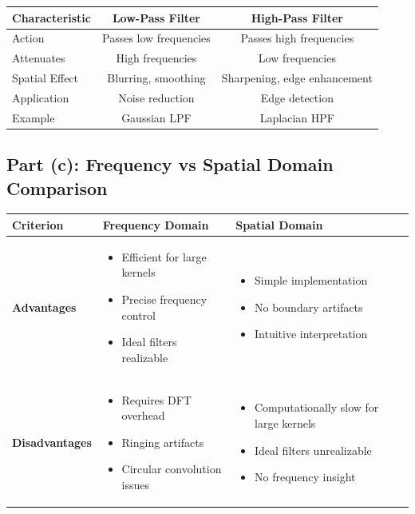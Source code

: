 \documentclass[12pt,a4paper]{article}
\begin{document}
\begin{center}
\begin{tabular}{|l|c|c|}
\hline
\textbf{Characteristic} & \textbf{Low-Pass Filter} & \textbf{High-Pass Filter} \\
\hline
Action & Passes low frequencies & Passes high frequencies \\
Attenuates & High frequencies & Low frequencies \\
Spatial Effect & Blurring, smoothing & Sharpening, edge enhancement \\
Application & Noise reduction & Edge detection \\
Example & Gaussian LPF & Laplacian HPF \\
\hline
\end{tabular}
\end{center}

\subsection*{Part (c): Frequency vs Spatial Domain Comparison}

\begin{center}
\begin{tabular}{|p{4cm}|p{4cm}|p{4cm}|}
\hline
\textbf{Criterion} & \textbf{Frequency Domain} & \textbf{Spatial Domain} \\
\hline
\textbf{Advantages} &
  \begin{itemize}
  \item Efficient for large kernels
  \item Precise frequency control
  \item Ideal filters realizable
  \end{itemize}
&
  \begin{itemize}
  \item Simple implementation
  \item No boundary artifacts
  \item Intuitive interpretation
  \end{itemize} \\
\hline
\textbf{Disadvantages} &
  \begin{itemize}
  \item Requires DFT overhead
  \item Ringing artifacts
  \item Circular convolution issues
  \end{itemize}
&
  \begin{itemize}
  \item Computationally slow for large kernels
  \item Ideal filters unrealizable
  \item No frequency insight
  \end{itemize} \\
\hline
\end{tabular}
\end{center}
\end{document}
